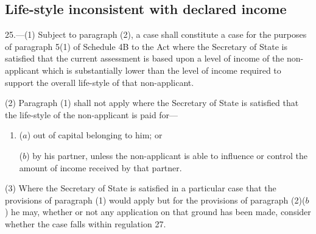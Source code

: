 \documentclass[12pt,a4paper]{article}
\begin{document}
\subsection[25. Life-style inconsistent with declared income]{Life-style inconsistent with declared income}

25.—(1) Subject to paragraph (2), a case shall constitute a case for the purposes of paragraph 5(1) of Schedule 4B to the Act where the Secretary of State is satisfied that the current 
assessment is based upon a level of income of the non-applicant which is substantially lower than the level of income required to support the overall life-style of that non-applicant.

%
%

(2) Paragraph (1) shall not apply where the Secretary of State is satisfied that the life-style of the non-applicant is paid for—
\begin{enumerate}\item[]
($a$) out of capital belonging to him; or

($b$) by his partner, unless the non-applicant is able to influence or control the amount of income received by that partner.
\end{enumerate}

(3) Where the Secretary of State is satisfied in a particular case that the provisions of paragraph (1) would apply but for the provisions of paragraph 
(2)($b$)  %
he may, whether or not any application on that ground has been made, consider whether the case falls within regulation 27.

\end{document}
